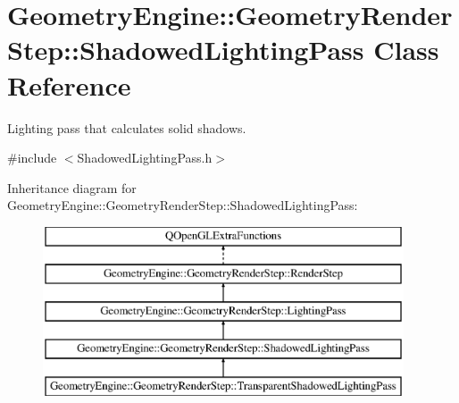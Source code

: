 \hypertarget{class_geometry_engine_1_1_geometry_render_step_1_1_shadowed_lighting_pass}{}\section{Geometry\+Engine\+::Geometry\+Render\+Step\+::Shadowed\+Lighting\+Pass Class Reference}
\label{class_geometry_engine_1_1_geometry_render_step_1_1_shadowed_lighting_pass}


Lighting pass that calculates solid shadows.  




{\ttfamily \#include $<$Shadowed\+Lighting\+Pass.\+h$>$}

Inheritance diagram for Geometry\+Engine\+::Geometry\+Render\+Step\+::Shadowed\+Lighting\+Pass\+:\begin{figure}[H]
\begin{center}
\leavevmode
\includegraphics[height=5.000000cm]{class_geometry_engine_1_1_geometry_render_step_1_1_shadowed_lighting_pass}
\end{center}
\end{figure}
